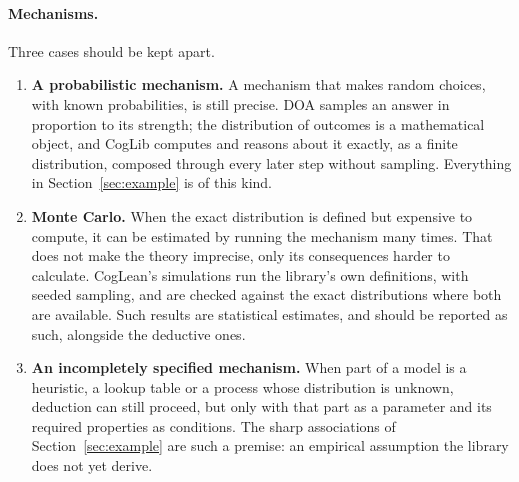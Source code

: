 \documentclass[11pt]{article}
\begin{document}
\paragraph{Mechanisms.} Three cases should be kept apart.
\begin{enumerate}
  \item \textbf{A probabilistic mechanism.} A mechanism that makes random choices, with known probabilities, is still precise. DOA samples an answer in proportion to its strength; the distribution of outcomes is a mathematical object, and CogLib computes and reasons about it exactly, as a finite distribution, composed through every later step without sampling. Everything in Section~\ref{sec:example} is of this kind.
  \item \textbf{Monte Carlo.} When the exact distribution is defined but expensive to compute, it can be estimated by running the mechanism many times. That does not make the theory imprecise, only its consequences harder to calculate. CogLean's simulations run the library's own definitions, with seeded sampling, and are checked against the exact distributions where both are available. Such results are statistical estimates, and should be reported as such, alongside the deductive ones.
  \item \textbf{An incompletely specified mechanism.} When part of a model is a heuristic, a lookup table or a process whose distribution is unknown, deduction can still proceed, but only with that part as a parameter and its required properties as conditions. The sharp associations of Section~\ref{sec:example} are such a premise: an empirical assumption the library does not yet derive.
\end{enumerate}
\end{document}
